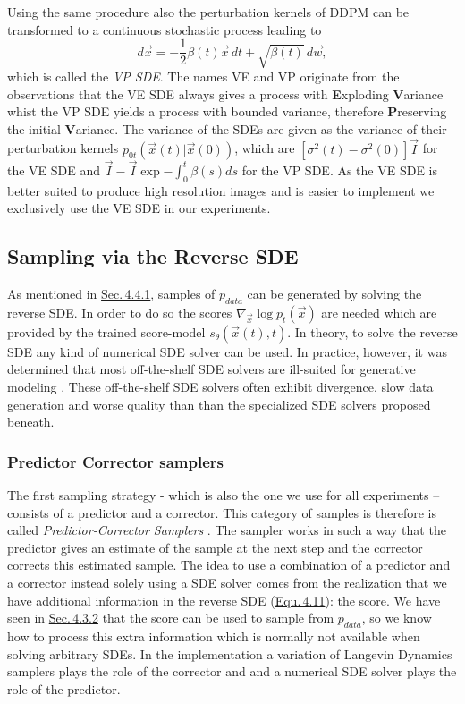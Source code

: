 Using the same procedure also the perturbation kernels of DDPM can be transformed to a continuous stochastic process leading to
%
\begin{equation} \label{equ:4.19}
    d\vec{x}=-\frac{1}{2}\beta(t)\vec{x}\,dt+\sqrt{\beta(t)}\,d\vec{w},
\end{equation}
%
which is called the \textit{VP SDE}. The names VE and VP originate from the observations that the VE SDE always gives a process with \textbf{E}xploding \textbf{V}ariance whist the VP SDE yields a process with bounded variance, therefore \textbf{P}reserving the initial \textbf{V}ariance. The variance of the SDEs are given as the variance of their perturbation kernels $p_{0t}(\vec{x}(t)|\vec{x}(0))$, which are $[\sigma^2(t)-\sigma^2(0)]\vec{I}$ for the VE SDE and $\vec{I}-\vec{I}\exp{-\int_0^t\beta(s)ds}$ for the VP SDE. As the VE SDE is better suited to produce high resolution images \cite{score_3} and is easier to implement we exclusively use the VE SDE in our experiments.

\subsection{Sampling via the Reverse SDE}
As mentioned in \hyperref[sec:4.4.1]{Sec.\,4.4.1}, samples of $p_{data}$ can be generated by solving the reverse SDE. In order to do so the scores $\nabla_{\vec{x}}\log p_t(\vec{x})$ are needed which are provided by the trained score-model $s_\theta(\vec{x}(t),t)$. In theory, to solve the reverse SDE any kind of numerical SDE solver can be used. In practice, however, it was determined that most off-the-shelf SDE solvers are ill-suited for generative modeling \cite{gotta_go_fast}. These off-the-shelf SDE solvers often exhibit divergence, slow data generation and worse quality than than the specialized SDE solvers proposed beneath.

\subsubsection{Predictor Corrector samplers}
The first sampling strategy - which is also the one we use for all experiments – consists of a predictor and a corrector. This category of samples is therefore is called \textit{Predictor-Corrector Samplers} \cite{score_3}. The sampler works in such a way that the predictor gives an estimate of the sample at the next step and the corrector corrects this estimated sample. The idea to use a combination of a predictor and a corrector instead solely using a SDE solver comes from the realization that we have additional information in the reverse SDE (\hyperref[equ:4.11]{Equ.\,4.11}): the score. We have seen in \hyperref[sec:4.3.2]{Sec.\,4.3.2} that the score can be used to sample from $p_{data}$, so we know how to process this extra information which is normally not available when solving arbitrary SDEs. In the implementation a variation of Langevin Dynamics samplers plays the role of the corrector and and a numerical SDE solver plays the role of the predictor.

